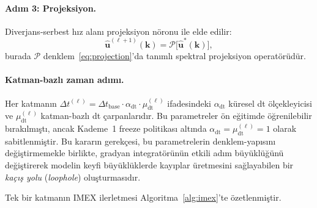 \paragraph{Adım 3: Projeksiyon.} Diverjans-serbest hız alanı projeksiyon nöronu ile elde edilir:
\begin{equation}
\hat{\mathbf{u}}^{(\ell+1)}(\mathbf{k}) = \mathcal{P}\big[\hat{\mathbf{u}}^{*}(\mathbf{k})\big],
\label{eq:imex_projection}
\end{equation}
burada $\mathcal{P}$ denklem~\eqref{eq:projection}'da tanımlı spektral projeksiyon operatörüdür.

\paragraph{Katman-bazlı zaman adımı.} Her katmanın $\Delta t^{(\ell)} = \Delta t_{\mathrm{base}}\cdot \alpha_{\mathrm{dt}}\cdot \mu_{\mathrm{dt}}^{(\ell)}$ ifadesindeki $\alpha_{\mathrm{dt}}$ küresel dt ölçekleyicisi ve $\mu_{\mathrm{dt}}^{(\ell)}$ katman-bazlı dt çarpanlarıdır. Bu parametreler ön eğitimde öğrenilebilir bırakılmıştı, ancak Kademe~1 freeze politikası altında $\alpha_{\mathrm{dt}}=\mu_{\mathrm{dt}}^{(\ell)}=1$ olarak sabitlenmiştir. Bu kararın gerekçesi, bu parametrelerin denklem-yapısını değiştirmemekle birlikte, gradyan integratörünün etkili adım büyüklüğünü değiştirerek modelin keyfi büyüklüklerde kayıplar üretmesini sağlayabilen bir \emph{kaçış yolu} (\textit{loophole}) oluşturmasıdır.

Tek bir katmanın IMEX ilerletmesi Algoritma~\ref{alg:imex}'te özetlenmiştir.

